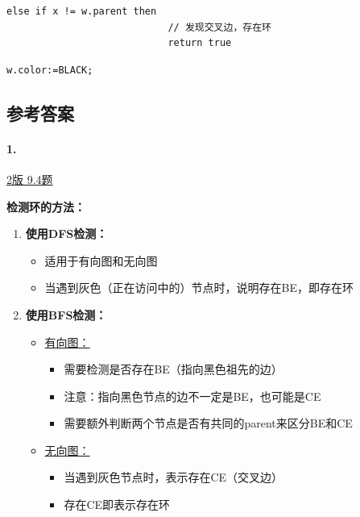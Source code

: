 \documentclass{article}
\begin{document}
\begin{lstlisting}[style=algorithm]
                        else if x != w.parent then
                            // 发现交叉边，存在环
                            return true
                        \end{lstlisting}

\begin{lstlisting}[style=algorithmPPT]
                        w.color:=BLACK;
\end{lstlisting}

\subsection{参考答案}

\paragraph{1.}

\href{https://github.com/Shannju/njucser_helphelp/blob/main/Algorithm%E7%AE%97%E6%B3%95/%E7%AD%94%E6%A1%88/P4~7.pdf}{2版 9.4题}

\noindent\textbf{检测环的方法：}

\begin{enumerate}
    \item \textbf{使用DFS检测：}
    \begin{itemize}
        \item 适用于有向图和无向图
        \item 当遇到灰色（正在访问中的）节点时，说明存在BE，即存在环
    \end{itemize}

    \item \textbf{使用BFS检测：}
    \begin{itemize}
        \item \underline{有向图：}
        \begin{itemize}
            \item 需要检测是否存在BE（指向黑色祖先的边）
            \item 注意：指向黑色节点的边不一定是BE，也可能是CE
            \item 需要额外判断两个节点是否有共同的parent来区分BE和CE
        \end{itemize}
        \item \underline{无向图：}
        \begin{itemize}
            \item 当遇到灰色节点时，表示存在CE（交叉边）
            \item 存在CE即表示存在环
        \end{itemize}
    \end{itemize}
\end{enumerate}
\end{document}
